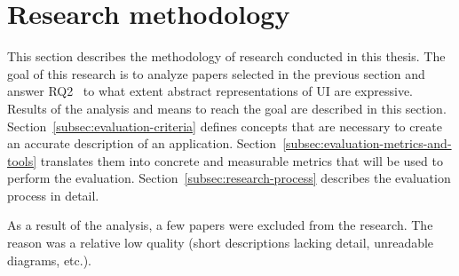 \section{Research methodology}\label{sec:research-methodology}

This section describes the methodology of research conducted in this thesis.
The goal of this research is to analyze papers selected in the previous section and answer RQ2 \textendash\ to what extent abstract representations of UI are expressive.
Results of the analysis and means to reach the goal are described in this section.
Section~\ref{subsec:evaluation-criteria} defines concepts that are necessary to create an accurate description of an application.
Section~\ref{subsec:evaluation-metrics-and-tools} translates them into concrete and measurable metrics that will be used to perform the evaluation.
Section~\ref{subsec:research-process} describes the evaluation process in detail.

As a result of the analysis, a few papers were excluded from the research.
The reason was a relative low quality (short descriptions lacking detail, unreadable diagrams, etc.).




